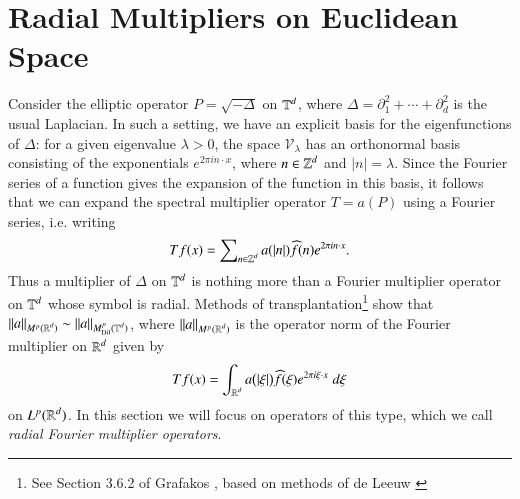 
%

%

\chapter{Radial Multipliers on Euclidean Space} \label{sec:radmult}

Consider the elliptic operator $P = \sqrt{-\Delta}$ on $\operatorname{\mathbb{T}}^d$, where $\Delta = \partial_1^2 + \cdots + \partial_d^2$ is the usual Laplacian. In such a setting, we have an explicit basis for the eigenfunctions of $\Delta$: for a given eigenvalue $\lambda > 0$, the space $\mathcal{V}_\lambda$ has an orthonormal basis consisting of the exponentials $e^{2 \pi i n \cdot x}$, where $n \in \operatorname{\mathbb{Z}}^d$ and $|n| = \lambda$. Since the Fourier series of a function gives the expansion of the function in this basis, it follows that we can expand the spectral multiplier operator $T = a(P)$ using a Fourier series, i.e. writing
%
\begin{equation}
  Tf(x) = \sum\nolimits_{n \in \operatorname{\mathbb{Z}}^d} a( |n| ) \widehat{f}(n) e^{2 \pi i n \cdot x}.
\end{equation}
%
Thus a multiplier of $\Delta$ on $\operatorname{\mathbb{T}}^d$ is nothing more than a Fourier multiplier operator on $\operatorname{\mathbb{T}}^d$ whose symbol is radial. Methods of transplantation\footnote{See Section 3.6.2 of Grafakos \cite{Grafakos}, based on methods of de Leeuw \cite{deLeeuw}} show that $\| a \|_{M^p(\operatorname{\mathbb{R}}^d)} \sim \| a \|_{M^p_{\text{Dil}}(\operatorname{\mathbb{T}}^d)}$, where $\| a \|_{M^p(\operatorname{\mathbb{R}}^d)}$ is the operator norm of the Fourier multiplier on $\operatorname{\mathbb{R}}^d$ given by
%
\begin{equation}
  Tf(x) = \int_{\operatorname{\mathbb{R}}^d} a \big(|\xi| \big) \widehat{f}(\xi) e^{2 \pi i \xi \cdot x}\; d\xi 
\end{equation}
%
on $L^p(\operatorname{\mathbb{R}}^d)$. In this section we will focus on operators of this type, which we call \emph{radial Fourier multiplier operators}.

